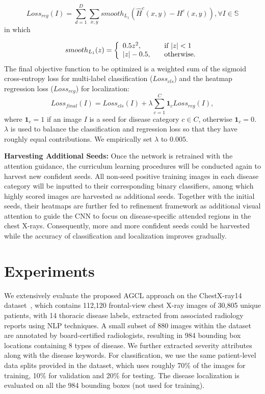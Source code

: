 \documentclass[runningheads,a4paper]{llncs}
\begin{document}
\begin{equation}\label{eq:l1_loss}
	Loss_{reg}(I) = \sum_{d=1}^{D}\sum_{x,y}smooth_{L_1}(\hat{H}^{c}{(x,y)}-H^{c}{(x,y)}), \forall{I}\in\mathbb{S}
\end{equation}
in which

\begin{equation}\label{eq:l1_loss}
	smooth_{L_1}(z) = \left\{
  \begin{array}{l l}
  0.5z^2,&  \quad \text{if $|z|<1$}\\
  |z|-0.5, & \quad \text{otherwise.}
  \end{array} \right.
\end{equation}
The final objective function to be optimized is a weighted sum of the sigmoid cross-entropy loss for multi-label classification ($Loss_{cls}$) and the heatmap regression loss ($Loss_{reg}$) for localization:
\begin{equation}\label{eq:loss_final}
	Loss_{final}(I) = Loss_{cls}(I) + \lambda \sum_{c=1}^{C}\mathbf{1}_{c} Loss_{reg}(I),
\end{equation}
where $\mathbf{1}_{c}=1$ if an image $I$ is a seed for disease category $c \in C$, otherwise $\mathbf{1}_{c}=0$. $\lambda$ is used to balance the classification and regression loss so that they have roughly equal contributions. We empirically set $\lambda$ to $0.005$. 

\textbf{Harvesting Additional Seeds:}
Once the network is retrained with the attention guidance, the curriculum learning procedures will be conducted again to harvest new confident seeds. All non-seed positive training images in each disease category will be inputted to their corresponding binary classifiers, among which highly scored images are harvested as additional seeds. Together with the initial seeds, their heatmaps are further fed to refinement framework as additional visual attention to guide the CNN to focus on disease-specific attended regions in the chest X-rays. Consequently, more and more confident seeds could be harvested while the accuracy of classification and localization improves gradually.

\section{Experiments}
\label{exp}

We extensively evaluate the proposed AGCL approach on the ChestX-ray14 dataset~\cite{Wang_CVPR2017}, %
which contains 112,120 frontal-view chest X-ray images of 30,805 unique patients, with 14 thoracic disease labels, extracted from associated radiology reports using NLP techniques. A small subset of 880 images within the dataset are annotated by board-certified radiologists, resulting in 984 bounding box locations containing 8 types of disease.
We further extracted severity attributes along with the disease keywords. For classification, we use the same patient-level data splits provided in the dataset, which uses roughly 70\% of the images for training, 10\% for validation and 20\% for testing. The disease localization is evaluated on all the 984 bounding boxes (not used for training).
\end{document}
